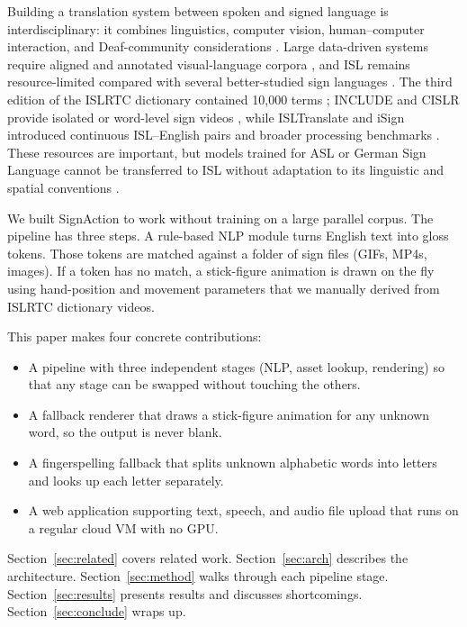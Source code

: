 \documentclass[conference]{IEEEtran}
\begin{document}
Building a translation system between spoken and signed language is interdisciplinary: it combines linguistics, computer vision, human--computer interaction, and Deaf-community considerations \cite{bragg2019}. Large data-driven systems require aligned and annotated visual-language corpora \cite{camgoz2020}, and ISL remains resource-limited compared with several better-studied sign languages \cite{joshi2024isign}. The third edition of the ISLRTC dictionary contained 10{,}000 terms \cite{islrtc2021}; INCLUDE and CISLR provide isolated or word-level sign videos \cite{sridhar2020, joshi2022cislr}, while ISLTranslate and iSign introduced continuous ISL--English pairs and broader processing benchmarks \cite{joshi2023isltranslate, joshi2024isign}. These resources are important, but models trained for ASL or German Sign Language cannot be transferred to ISL without adaptation to its linguistic and spatial conventions \cite{joshi2024isign}.

We built SignAction to work without training on a large parallel corpus. The pipeline has three steps. A rule-based NLP module turns English text into gloss tokens. Those tokens are matched against a folder of sign files (GIFs, MP4s, images). If a token has no match, a stick-figure animation is drawn on the fly using hand-position and movement parameters that we manually derived from ISLRTC dictionary videos.

This paper makes four concrete contributions:
\begin{itemize}
    \item A pipeline with three independent stages (NLP, asset lookup, rendering) so that any stage can be swapped without touching the others.
    \item A fallback renderer that draws a stick-figure animation for any unknown word, so the output is never blank.
    \item A fingerspelling fallback that splits unknown alphabetic words into letters and looks up each letter separately.
    \item A web application supporting text, speech, and audio file upload that runs on a regular cloud VM with no GPU.
\end{itemize}

Section~\ref{sec:related} covers related work. Section~\ref{sec:arch} describes the architecture. Section~\ref{sec:method} walks through each pipeline stage. Section~\ref{sec:results} presents results and discusses shortcomings. Section~\ref{sec:conclude} wraps up.
\end{document}
